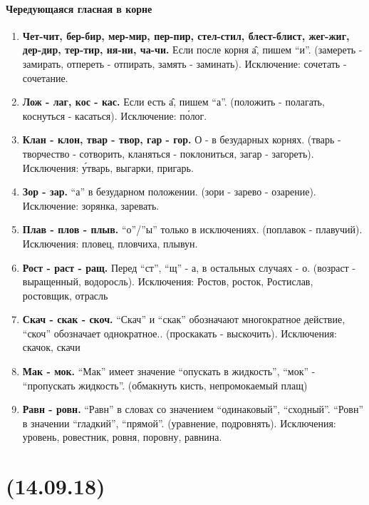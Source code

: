 \documentclass{article}
\begin{document}
\paragraph{Чередующаяся гласная в корне}
\begin{enumerate}
\item
  \textbf{Чет-чит, бер-бир, мер-мир, пер-пир, стел-стил, блест-блист, жег-жиг, дер-дир, тер-тир, ня-ни, ча-чи.}
  Если после корня \^{а}, пишем ``и''. (замереть - замирать, отпереть - отпирать, замять - заминать).
  Исключение: сочетать - сочетание.
\item
  \textbf{Лож - лаг, кос - кас.} Если есть \^{а}, пишем ``а''. (положить - полагать, коснуться - касаться).
  Исключение: п\'{о}лог.
\item
  \textbf{Клан - клон, твар - твор, гар - гор.} О - в безударных корнях. (тварь - творчество - сотворить, кланяться -
  поклониться, загар - загореть). Исключения: \'{у}тварь, выгарки, пригарь.
\item
  \textbf{Зор - зар.} ``а'' в безударном положении. (зори - зарево - озарение). Исключение: зорянка, заревать.
\item
  \textbf{Плав - плов - плыв.} ``о''/''ы'' только в исключениях. (поплавок - плавучий).
  Исключения: пловец, пловчиха, плывун.
\item
  \textbf{Рост - раст - ращ.} Перед ``ст'', ``щ'' - а, в остальных случаях - о. (возраст - выращенный, водоросль).
  Исключения: Ростов, росток, Ростислав, ростовщик, отрасль
\item
  \textbf{Скач - скак - скоч.} ``Скач'' и ``скак'' обозначают многократное действие, ``скоч'' обозначает однократное..
  (проскакать - выскочить). Исключения: скачок, скачи
\item
  \textbf{Мак - мок.} ``Мак'' имеет значение ``опускать в жидкость'',
  ``мок'' - ``пропускать жидкость''. (обмакнуть кисть, непромокаемый плащ)
\item
  \textbf{Равн - ровн.} ``Равн'' в словах со значением ``одинаковый'', ``сходный''. ``Ровн'' в значении ``гладкий'',
  ``прямой''. (уравнение, подровнять). Исключения: уровень, ровестник, ровня, поровну, равнина.
\end{enumerate}

\noindent\makebox[\linewidth]{\rule{\paperwidth}{0.4pt}}
\section{(14.09.18)}
\noindent\makebox[\linewidth]{\rule{\paperwidth}{0.4pt}}
\paragraph{}
\end{document}
